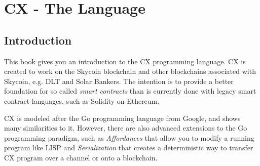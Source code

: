 \documentclass[11pt,fleqn,openany]{book} %
\begin{document}
\noindent \textit{} %



\pagestyle{empty} %

\tableofcontents %


\pagestyle{fancy} %

\part{CX - The Language}


 
\chapter{Introduction}
\label{chapter:introduction}

This book gives you an introduction to the CX programming language. CX is created to work on the Skycoin blockchain and other blockchains associated with Skycoin, e.g. DLT and Solar Bankers.  The intention is to provide a better foundation for so called \emph{smart contracts} than is currently done with legacy smart contract languages, such as Solidity on Ethereum.

CX is modeled after the Go programming language from Google, and shows many similarities to it. However, there are also advanced extensions to the Go programming paradigm, such as \emph{Affordances} that allow you to modify a running program like LISP and \emph{Serialization} that creates a deterministic way to transfer CX program over a channel or onto a blockchain.
\end{document}
